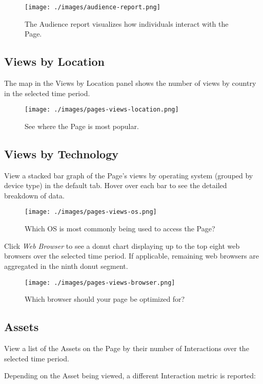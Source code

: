\begin{figure}
\centering
\texttt{[image: ./images/audience-report.png]}
\caption{The Audience report visualizes how individuals interact with
the Page.}
\end{figure}

\subsection{Views by Location}\label{views-by-location}

The map in the Views by Location panel shows the number of views by
country in the selected time period.

\begin{figure}
\centering
\texttt{[image: ./images/pages-views-location.png]}
\caption{See where the Page is most popular.}
\end{figure}

\subsection{Views by Technology}\label{views-by-technology}

View a stacked bar graph of the Page's views by operating system
(grouped by device type) in the default tab. Hover over each bar to see
the detailed breakdown of data.

\begin{figure}
\centering
\texttt{[image: ./images/pages-views-os.png]}
\caption{Which OS is most commonly being used to access the Page?}
\end{figure}

Click \emph{Web Browser} to see a donut chart displaying up to the top
eight web browsers over the selected time period. If applicable,
remaining web browsers are aggregated in the ninth donut segment.

\begin{figure}
\centering
\texttt{[image: ./images/pages-views-browser.png]}
\caption{Which browser should your page be optimized for?}
\end{figure}

\subsection{Assets}\label{assets}

View a list of the Assets on the Page by their number of Interactions
over the selected time period.

Depending on the Asset being viewed, a different Interaction metric is
reported:

